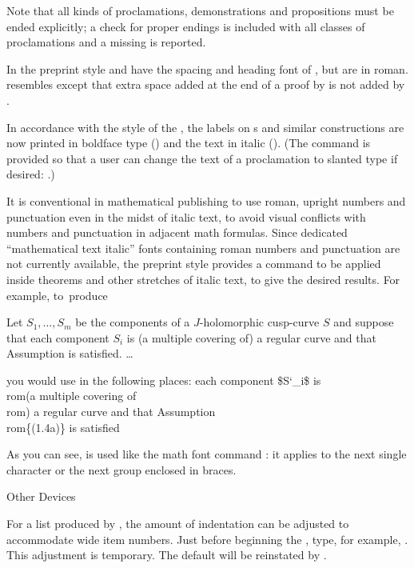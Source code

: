 Note that all kinds of proclamations, demonstrations and propositions
must be ended explicitly; a check for proper endings is included with
all classes of proclamations and a missing  is reported.

In the preprint style  and  have
the spacing and heading font of , but are in roman.
 resembles 
except that extra space added at the end of a proof by 
is not added by .

In accordance with the style of the \JAMS, the labels on s
and similar constructions are now printed in boldface type ()
and the text in italic ().  (The command  is
provided so that a user can change the text of a proclamation to
slanted type if desired: .)

It is conventional in mathematical publishing to use roman,  upright
numbers and punctuation even in the midst of
italic text, to avoid visual conflicts with numbers and punctuation in
adjacent math formulas.  Since dedicated ``mathematical text italic''
fonts containing roman numbers and punctuation are not currently
available, the  preprint style provides a command
 to be applied  inside theorems and other stretches of
italic text, to give the desired results.
For example, to~produce

 Let $S_1,\dots,S_m$ be the components
of a $J$-holomorphic cusp-curve $S$ and suppose that each
component $S_i$ is \rom(a multiple covering of\rom) a regular
curve and that Assumption  is satisfied. \dots
\endproclaim

\noindent you would use  in the following places:
\beginexample{}
each component \$S\char`\_i\$ is \\rom(a multiple covering of\\rom) a
regular curve and that Assumption \\rom\{(1.4a)\} is satisfied
\endexample

As you can see,  is used like the math font command :
it applies to the next single character or the next group enclosed in
braces.

\subhead Other Devices \endsubhead

For a list produced by , the amount of indentation can be
adjusted to accommodate wide item numbers.  Just before beginning the
, type, for example, .
This adjustment is temporary.  The default will be reinstated by
.

